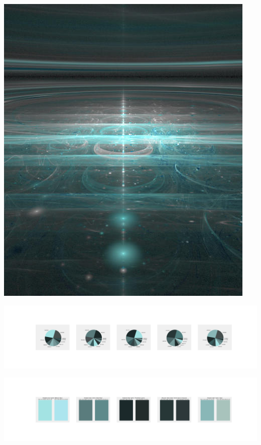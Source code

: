 \documentclass[11pt]{article}
\begin{document}
\begin{landscape}
    \begin{center}
    \includegraphics[width=\textwidth]{./nbimg/file (14).jpg}
    \end{center}

    \begin{center}
    \includegraphics[width=250mm]{./nbimg/pie-45.jpg}
    \end{center}

    \begin{center}
    \includegraphics[width=250mm]{./nbimg/peak-45.jpg}
    \end{center}
    


\end{landscape}
\end{document}
